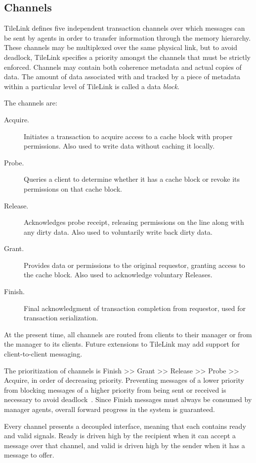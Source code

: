 \subsection{Channels}

TileLink defines five independent transaction channels over which messages can be sent by agents in order to transfer information through the memory hierarchy.
These channels may be multiplexed over the same physical link, but to avoid deadlock, TileLink specifies a priority amongst the channels that must be strictly enforced.
Channels may contain both coherence metadata and actual copies of data.
The amount of data associated with and tracked by a piece of metadata within a particular level of TileLink is called a data {\em block}.

The channels are:
\begin{description}
\item[Acquire.] Initiates a transaction to acquire access to a cache block with proper permissions. Also used to write data without caching it locally.
\item[Probe.] Queries a client to determine whether it has a cache block or revoke its permissions on that cache block.
\item[Release.] Acknowledges probe receipt, releasing permissions on the line along with any dirty data. Also used to voluntarily write back dirty data.
\item[Grant.] Provides data or permissions to the original requestor, granting access to the cache block. Also used to acknowledge voluntary Releases.
\item[Finish.] Final acknowledgment of transaction completion from requestor, used for transaction serialization.
\end{description}

At the present time, all channels are routed from clients to their manager or from the manager to its clients.
Future extensions to TileLink may add support for client-to-client messaging.

The prioritization of channels is Finish >> Grant >> Release >> Probe >> Acquire, in order of decreasing priority.
Preventing messages of a lower priority from blocking messages of a higher priority from being sent or received is necessary to avoid deadlock~\cite{sorin2011primer}.
Since Finish messages must always be consumed by manager agents, overall forward progress in the system is guaranteed.

Every channel presents a decoupled interface, meaning that each contains ready and valid signals.
Ready is driven high by the recipient when it can accept a message over that channel,
and valid is driven high by the sender when it has a message to offer.

